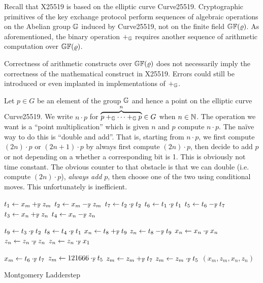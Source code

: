 

Recall that X25519 is based on the elliptic curve Curve25519.
Cryptographic primitives of the key exchange protocol perform
sequences of algebraic operations on the Abelian group $\mathbb{G}$ induced
by Curve25519, not on the finite field $\mathbb{GF}(\varrho)$. As
aforementioned, the binary operation $+_{\mathbb{G}}$ requires another
sequence of arithmetic computation over $\mathbb{GF}(\varrho)$.

Correctness of arithmetic constructs over $\mathbb{GF}(\varrho)$ does not
necessarily imply the correctness of the mathematical construct in
X25519. Errors could still be introduced or even implanted in
implementations of $+_{\mathbb{G}}$.

Let $p \in G$ be an element of the group $\mathbb{G}$ and hence a point on
the elliptic curve Curve25519. We write $n \cdot p$ for
$\overbrace{p +_{\mathbb{G}} \cdots +_{\mathbb{G}} p}^n \in G$ when $n \in \mathbb{N}$.
The operation we want is a ``point multiplication'' which is given $n$
and $p$ compute $n \cdot p$.  The na\"ive way to do this is ``double
and add''.  That is, starting from $n \cdot p$, we first compute
$(2n) \cdot p$ or $(2n+1) \cdot p$ by always first compute
$(2n) \cdot p$, then decide to add $p$ or not depending on a whether a
corresponding bit is 1.  This is obviously not time constant.  The
obvious counter to that obstacle is that we can double (i.e. compute
$(2n)\cdot p$), \emph{always add} $p$, then choose one of the two using
conditional moves.  This unfortunately is inefficient.

\begin{algorithm}[h]
\label{evaluation:ladder-step:montgomery}
\begin{algorithmic}[1]
\begin{multicols}{3}
\State $t_1 \leftarrow x_m +_{\mathbb{F}} z_m$
\State $t_2 \leftarrow x_m -_{\mathbb{F}} z_m$
\State $t_7 \leftarrow t_2 \cdot_{\mathbb{F}} t_2$
\State $t_6 \leftarrow t_1 \cdot_{\mathbb{F}} t_1$
\State $t_5 \leftarrow t_6 -_{\mathbb{F}} t_7$
\State $t_3 \leftarrow x_n +_{\mathbb{F}} z_n$
\State $t_4 \leftarrow x_n -_{\mathbb{F}} z_n$\rule{0ex}{0ex}
\State $t_9 \leftarrow t_3 \cdot_{\mathbb{F}} t_2$
\State $t_8 \leftarrow t_4 \cdot_{\mathbb{F}} t_1$
\State $x_n \leftarrow t_8 +_{\mathbb{F}} t_9$
\State $z_n \leftarrow t_8 -_{\mathbb{F}} t_9$
\State $x_n \leftarrow x_{n} \cdot_{\mathbb{F}} x_{n}$
\State $z_n \leftarrow z_{n} \cdot_{\mathbb{F}} z_{n}$
\State $z_n \leftarrow z_{n} \cdot_{\mathbb{F}} x_1$\rule{0ex}{0ex} 
\State $x_m \leftarrow t_6 \cdot_{\mathbb{F}} t_7$
\State $z_m \leftarrow 121666 \cdot_{\mathbb{F}} t_5$
\State $z_m \leftarrow z_m +_{\mathbb{F}} t_7$
\State $z_m \leftarrow z_m \cdot_{\mathbb{F}} t_5$
\State \Return $(x_m, z_m, x_n, z_n)$
\EndFunction
\end{multicols}
\end{algorithmic}
\caption{Montgomery Ladderstep}
\end{algorithm}


